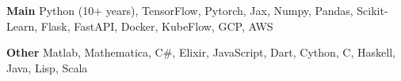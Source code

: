 \textbf{Main}
Python (10+ years), TensorFlow, Pytorch, Jax, Numpy, Pandas, Scikit-Learn, Flask, FastAPI, Docker, KubeFlow, GCP, AWS

\textbf{Other}
Matlab, Mathematica, C\#, Elixir, JavaScript, Dart, Cython, C, Haskell, Java, Lisp, Scala